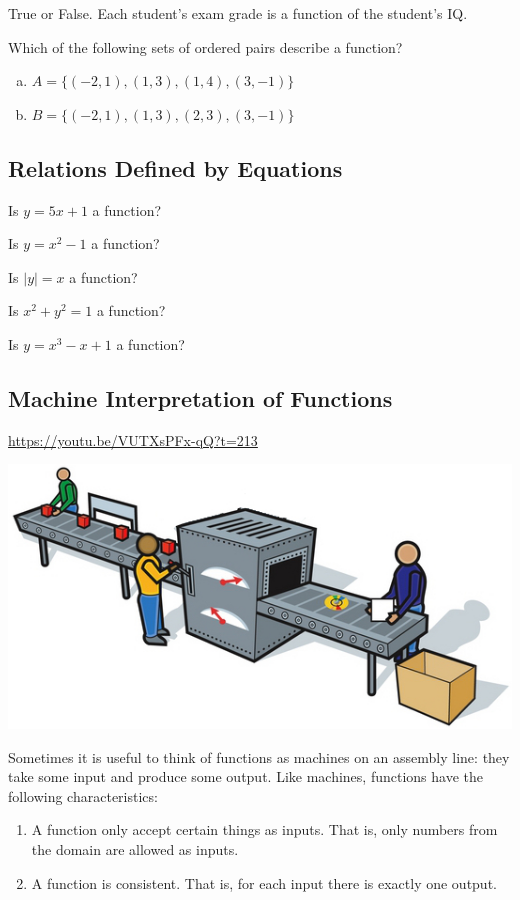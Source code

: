 \documentclass[oneside,10pt]{book}
\begin{document}
\example
True or False. Each student's exam grade is a function of the student's IQ.
\vspace{1in}



\example
   Which of the following sets of ordered pairs describe a function?
  \begin{enumerate}[(a)]
    \item  $A = \{ (-2,1), (1,3), (1,4), (3,-1) \}$
    \item  $B = \{ (-2,1), (1,3), (2,3), (3,-1) \}$
  \end{enumerate}



\subsection{Relations Defined by Equations}

\example
Is $y=5x+1$ a function?
\vfill


\example
Is $y=x^2-1$ a function?
\vfill


\example
Is $|y|=x$ a function?
\vfill


\example
Is $x^2+y^2=1$ a function?
\vfill



\example
Is $y=x^3-x+1$ a function?
\vfill


\newpage


\subsection{Machine Interpretation of Functions}

\url{https://youtu.be/VUTXsPFx-qQ?t=213}

\includegraphics[width=0.5\linewidth]{3-1-lecture/001Production_Line.jpg}

Sometimes it is useful to think of functions as machines on an assembly line:
they take some input and produce some output. Like machines, functions have the
following characteristics:

\begin{enumerate}
  \item
    A function only accept certain things as inputs.
    That is, only numbers from the domain are allowed as inputs.
  \item
    A function is consistent.
    That is, for each input there is exactly one output.
\end{enumerate}
\end{document}
